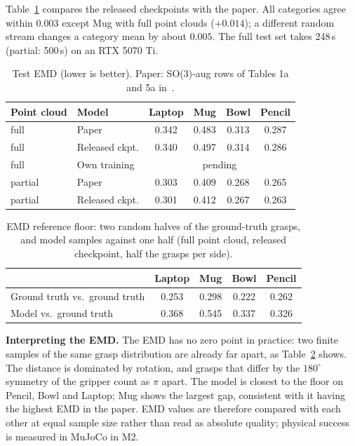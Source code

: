 \documentclass[conference]{IEEEtran}
\begin{document}
Table~\ref{tab:emd} compares the released checkpoints with the paper. All categories agree within
$0.003$ except Mug with full point clouds ($+0.014$); a different random stream changes a category mean
by about $0.005$. The full test set takes 248\,s (partial: 500\,s) on an RTX 5070 Ti.

\begin{table}[!t]
  \centering
  \caption{Test EMD (lower is better). Paper: SO(3)-aug rows of Tables 1a and 5a in~\cite{lim2024equigraspflow}.}
  \label{tab:emd}
  \begin{tabular}{@{}llcccc@{}}
    \toprule
    Point cloud & Model & Laptop & Mug & Bowl & Pencil \\
    \midrule
    full & Paper & 0.342 & 0.483 & 0.313 & 0.287 \\
    full & Released ckpt. & 0.340 & 0.497 & 0.314 & 0.286 \\
    full & Own training & \multicolumn{4}{c}{pending} \\
    \midrule
    partial & Paper & 0.303 & 0.409 & 0.268 & 0.265 \\
    partial & Released ckpt. & 0.301 & 0.412 & 0.267 & 0.263 \\
    \bottomrule
  \end{tabular}
\end{table}

\begin{table}[!t]
  \centering
  \caption{EMD reference floor: two random halves of the ground-truth grasps, and model samples against
  one half (full point cloud, released checkpoint, half the grasps per side).}
  \label{tab:floor}
  \begin{tabular}{@{}lcccc@{}}
    \toprule
    & Laptop & Mug & Bowl & Pencil \\
    \midrule
    Ground truth vs.\ ground truth & 0.253 & 0.298 & 0.222 & 0.262 \\
    Model vs.\ ground truth & 0.368 & 0.545 & 0.337 & 0.326 \\
    \bottomrule
  \end{tabular}
\end{table}

\textbf{Interpreting the EMD.} The EMD has no zero point in practice: two finite samples of the same grasp
distribution are already far apart, as Table~\ref{tab:floor} shows. The distance is dominated by
rotation, and grasps that differ by the $180^\circ$ symmetry of the gripper count as $\pi$ apart. The
model is closest to the floor on Pencil, Bowl and Laptop; Mug shows the largest gap, consistent with it
having the highest EMD in the paper. EMD values are therefore compared with each other at equal sample
size rather than read as absolute quality; physical success is measured in MuJoCo in M2.
\end{document}
